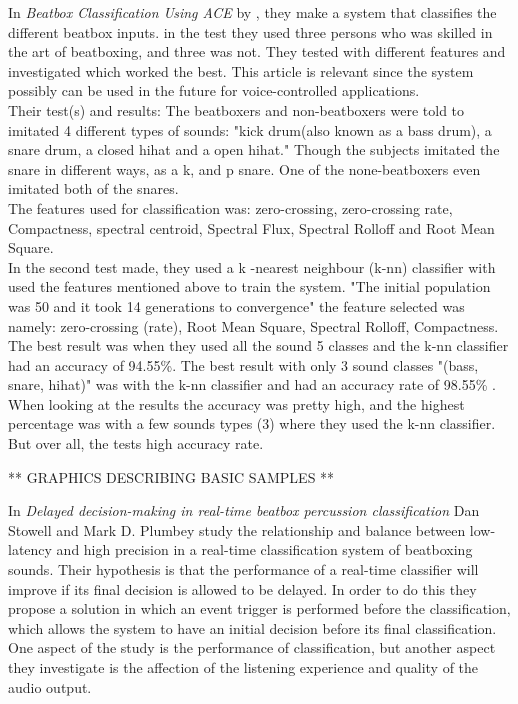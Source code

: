 In \textit{Beatbox Classification Using ACE} by \citep{Sinyor05}, they make a system that classifies the different beatbox inputs. in the test they used three persons who was skilled in the art of beatboxing, and three was not. \citep{Sinyor05} They tested with different features and investigated which worked the best. This article is relevant since the system possibly can be used in the future for voice-controlled applications.\\
Their test(s) and results:
The beatboxers and non-beatboxers were told to imitated 4 different types of sounds: "kick drum(also known as a bass drum), a snare drum, a closed hihat and a open hihat."\citep{Sinyor05} Though the subjects imitated the snare in different ways, as a k, and p snare. One of the none-beatboxers even imitated both of the snares.\\
The features \citep{Sinyor05} used for classification was: zero-crossing, zero-crossing rate, Compactness, spectral centroid, Spectral Flux, Spectral Rolloff and Root Mean Square\citep{Sinyor05}.\\
In the second test \citep{Sinyor05} made, they used a k -nearest neighbour (k-nn) classifier with used the features mentioned above to train the system. "The initial population was 50 and it took 14 generations to convergence" \citep{Sinyor05} the feature selected was namely: zero-crossing (rate), Root Mean Square, Spectral Rolloff, Compactness.\\ 
The best result was when they used all the sound 5 classes and the k-nn classifier had an accuracy of 94.55\%. The best result with only 3 sound classes "(bass, snare, hihat)" \citep{Sinyor05} was with the k-nn classifier and had an accuracy rate of 98.55\% \citep{Sinyor05}.\\
When looking at the results the accuracy was pretty high, and the highest percentage was with a few sounds types (3)  where they used the k-nn classifier. But over all, the tests high accuracy rate.

** GRAPHICS DESCRIBING BASIC SAMPLES ** 

In \textit{Delayed decision-making in real-time beatbox percussion classification} Dan Stowell and Mark D. Plumbey study the relationship and balance between low-latency and high precision in a real-time classification system of beatboxing sounds. Their hypothesis is that the performance of a real-time classifier will improve if its final decision is allowed to be delayed. 
In order to do this they propose a solution in which an event trigger is performed before the classification, which allows the system to have an initial decision before its final classification. One aspect of the study is the performance of classification, but another aspect they investigate is the affection of the listening experience and quality of the audio output. 


